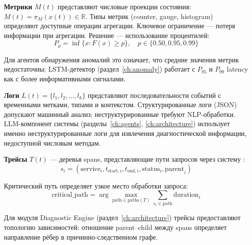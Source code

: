 \textbf{Метрики} $M(t)$ представляют числовые проекции состояния: $M(t) = \pi_M(x(t)) \in \mathbb{R}$. Типы метрик (counter, gauge, histogram) определяют доступные операции агрегации. Ключевое ограничение --- потеря информации при агрегации. Решение --- использование процентилей:
\begin{equation}
P_p = \inf\{x : F(x) \geq p\}, \quad p \in \{0.50, 0.95, 0.99\}
\label{eq:percentile}
\end{equation}

Для агентов обнаружения аномалий это означает, что средние значения метрик недостаточны; LSTM-детектор (раздел~\ref{ch:anomaly}) работает с $P_{95}$ и $P_{99}$ latency как с более информативными сигналами.

\textbf{Логи} $L(t) = \{l_1, l_2, \ldots, l_k\}$ представляют последовательности событий с временными метками, типами и контекстом. Структурированные логи (JSON) допускают машинный анализ; неструктурированные требуют NLP-обработки. LLM-компонент системы (разделы~\ref{ch:agents}, \ref{ch:architecture}) использует именно неструктурированные логи для извлечения диагностической информации, недоступной числовым методам.

\textbf{Трейсы} $T(t)$ --- деревья spans, представляющие пути запросов через систему \cite{distributed_tracing,distributed_tracing_survey}:
\begin{equation}
s_i = (\text{service}_i, t_{\text{start},i}, t_{\text{end},i}, \text{status}_i, \text{parent}_i)
\label{eq:span_tuple}
\end{equation}

Критический путь определяет узкое место обработки запроса:
\begin{equation}
\text{critical\_path} = \arg\max_{\text{path} \in \text{paths}(T)} \sum_{s_i \in \text{path}} \text{duration}_i
\label{eq:critical_path}
\end{equation}

Для модуля Diagnostic Engine (раздел~\ref{ch:architecture}) трейсы предоставляют топологию зависимостей: отношение parent--child между spans определяет направление рёбер в причинно-следственном графе.

